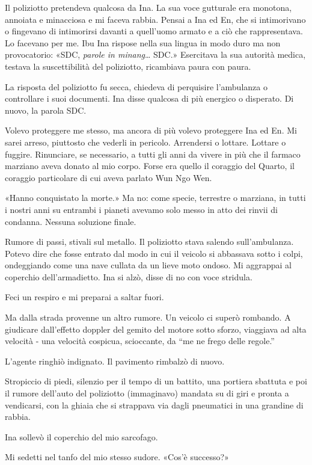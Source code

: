 Il poliziotto pretendeva qualcosa da Ina. La sua voce gutturale era
monotona, annoiata e minacciosa e mi faceva rabbia. Pensai a Ina ed En,
che si intimorivano o fingevano di intimorirsi davanti a quell'uomo
armato e a ciò che rappresentava. Lo facevano per me. Ibu Ina rispose
nella sua lingua in modo duro ma non provocatorio: «SDC, \emph{parole in
	minang}\ldots{} SDC.» Esercitava la sua autorità medica, testava la
suscettibilità del poliziotto, ricambiava paura con paura.

La risposta del poliziotto fu secca, chiedeva di perquisire l'ambulanza
o controllare i suoi documenti. Ina disse qualcosa di più energico o
disperato. Di nuovo, la parola SDC.

Volevo proteggere me stesso, ma ancora di più volevo proteggere Ina ed
En. Mi sarei arreso, piuttosto che vederli in pericolo. Arrendersi o
lottare. Lottare o fuggire. Rinunciare, se necessario, a tutti gli anni
da vivere in più che il farmaco marziano aveva donato al mio corpo.
Forse era quello il coraggio del Quarto, il coraggio particolare di cui
aveva parlato Wun Ngo Wen.

«Hanno conquistato la morte.» Ma no: come specie, terrestre o marziana,
in tutti i nostri anni su entrambi i pianeti avevamo solo messo in atto
dei rinvii di condanna. Nessuna soluzione finale.

Rumore di passi, stivali sul metallo. Il poliziotto stava salendo
sull'ambulanza. Potevo dire che fosse entrato dal modo in cui il veicolo
si abbassava sotto i colpi, ondeggiando come una nave cullata da un
lieve moto ondoso. Mi aggrappai al coperchio dell'armadietto. Ina si
alzò, disse di no con voce stridula.

Feci un respiro e mi preparai a saltar fuori.

Ma dalla strada provenne un altro rumore. Un veicolo ci superò rombando.
A giudicare dall'effetto doppler del gemito del motore sotto sforzo,
viaggiava ad alta velocità - una velocità cospicua, scioccante, da ``me
ne frego delle regole.''

L'agente ringhiò indignato. Il pavimento rimbalzò di nuovo.

Stropiccio di piedi, silenzio per il tempo di un battito, una portiera
sbattuta e poi il rumore dell'auto del poliziotto (immaginavo) mandata
su di giri e pronta a vendicarsi, con la ghiaia che si strappava via
dagli pneumatici in una grandine di rabbia.

Ina sollevò il coperchio del mio sarcofago.

Mi sedetti nel tanfo del mio stesso sudore. «Cos'è successo?»

